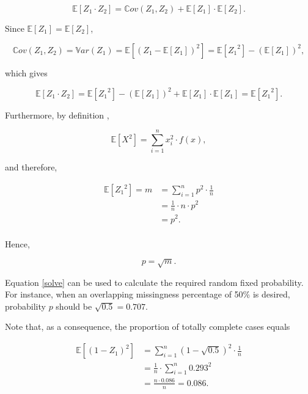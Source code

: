 \documentclass[11pt,a4paper]{article}
\begin{document}
\begin{equation}\label{general}
\mathbb{E}[Z_1 \cdot Z_2] = \mathbb{C}ov(Z_{1}, Z_{2}) + \mathbb{E}[Z_1] \cdot \mathbb{E}[Z_2]. 
\end{equation}

\noindent Since $\mathbb{E}[Z_1] = \mathbb{E}[Z_2]$, 

\begin{equation}\label{cov}
\mathbb{C}ov(Z_{1}, Z_{2}) = \mathbb{V}ar(Z_1) = \mathbb{E}[(Z_1 - \mathbb{E}[Z_1])^2] = \mathbb{E}[{Z_1}^2] - {(\mathbb{E}[Z_1])}^2,
\end{equation}

\noindent which gives

\begin{equation}\label{similar}
\mathbb{E}[Z_1 \cdot Z_2] = \mathbb{E}[{Z_1}^2] - {(\mathbb{E}[Z_1])}^2 + \mathbb{E}[Z_1] \cdot \mathbb{E}[Z_1] =  \mathbb{E}[{Z_1}^2]. 
\end{equation}

\noindent Furthermore, by definition \citep{Freund}, 

\begin{equation*}
\mathbb{E}[X^2] = \sum_{i = 1}^n x_i^2 \cdot f(x),  
\end{equation*}

\noindent and therefore, 

\begin{align*}
\mathbb{E}[{Z_1}^2] = m &= \sum_{i = 1}^n p^2 \cdot \frac{1}{n}\\
&= \frac{1}{n} \cdot n \cdot p^2\\
&= p^2.\\
\end{align*}

\noindent Hence,

\begin{equation}\label{solve}
p = \sqrt{m}.
\end{equation}

\noindent Equation \eqref{solve} can be used to calculate the required random fixed probability. For instance, when an overlapping missingness percentage of 50\% is desired, probability $p$ should be $\sqrt{0.5} = 0.707$. 

\noindent Note that, as a consequence, the proportion of totally complete cases equals

\begin{align*}
\mathbb{E}[(1-Z_1)^2] &= \sum_{i = 1}^n {(1-\sqrt{0.5})}^2 \cdot \frac{1}{n} \\
&= \frac{1}{n} \cdot \sum_{i = 1}^n 0.293^2 \\
&= \frac{n \cdot 0.086}{n} = 0.086.
\end{align*}
\end{document}
